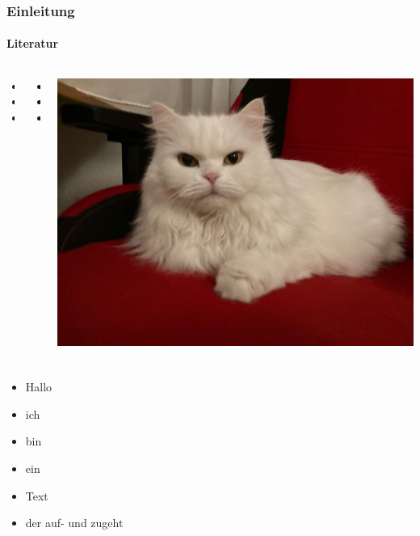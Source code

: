 \documentclass[14pt,ngerman]{beamer}
\begin{document}
\begin{frame}
\frametitle{Einleitung}
\framesubtitle{Literatur}

\begin{columns}
\begin{column}{0.32\textwidth}
\begin{itemize}
	\item 
	\item 
	\item 
\end{itemize}
\end{column}
\begin{column}{0.32\textwidth}
\begin{itemize}
	\item 
	\item 
	\item 
\end{itemize}
\end{column}
\begin{column}{0.32\textwidth}

\includegraphics[width=\textwidth]{Bilder/Katze}

\end{column}

\end{columns}
\end{frame}

\begin{frame}
\frametitle{}

\begin{itemize}
\item<2> Hallo
\item<1-> ich 
\item<3-4>bin
\item<6> ein
\item<5> Text
\item der auf- und zugeht
\end{itemize}
\end{frame}
\end{document}

